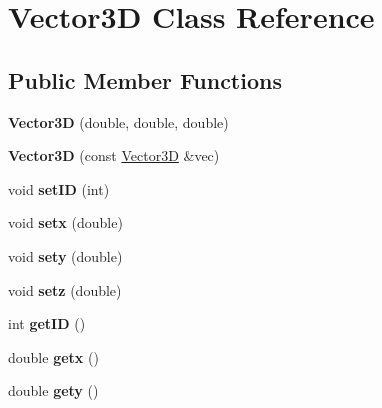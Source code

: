 \hypertarget{class_vector3_d}{}\section{Vector3D Class Reference}
\label{class_vector3_d}
\subsection*{Public Member Functions}
\begin{DoxyCompactItemize}
\item 
{\bfseries Vector3D} (double, double, double)\hypertarget{class_vector3_d_a46f27d7bc47396e866b1921d315af059}{}\label{class_vector3_d_a46f27d7bc47396e866b1921d315af059}

\item 
{\bfseries Vector3D} (const \hyperlink{class_vector3_d}{Vector3D} \&vec)\hypertarget{class_vector3_d_a633baeac49ac713d9ae4cdf061ee9ecf}{}\label{class_vector3_d_a633baeac49ac713d9ae4cdf061ee9ecf}

\item 
void {\bfseries set\+ID} (int)\hypertarget{class_vector3_d_aa0da3e0a1eaee2afab055f0ee1b81890}{}\label{class_vector3_d_aa0da3e0a1eaee2afab055f0ee1b81890}

\item 
void {\bfseries setx} (double)\hypertarget{class_vector3_d_a75b4ba79d772f9a3fc9279c42e825dde}{}\label{class_vector3_d_a75b4ba79d772f9a3fc9279c42e825dde}

\item 
void {\bfseries sety} (double)\hypertarget{class_vector3_d_a491df193924ad7d506118d3c2107e534}{}\label{class_vector3_d_a491df193924ad7d506118d3c2107e534}

\item 
void {\bfseries setz} (double)\hypertarget{class_vector3_d_a677b550d243c23199a3770ee81153464}{}\label{class_vector3_d_a677b550d243c23199a3770ee81153464}

\item 
int {\bfseries get\+ID} ()\hypertarget{class_vector3_d_ae1417b327719d8976fbeb043a133731d}{}\label{class_vector3_d_ae1417b327719d8976fbeb043a133731d}

\item 
double {\bfseries getx} ()\hypertarget{class_vector3_d_a15c82882374b06215f64f0e7329a23db}{}\label{class_vector3_d_a15c82882374b06215f64f0e7329a23db}

\item 
double {\bfseries gety} ()\hypertarget{class_vector3_d_a891207bd6706565ae15443379d772565}{}\label{class_vector3_d_a891207bd6706565ae15443379d772565}


\end{DoxyCompactItemize}
